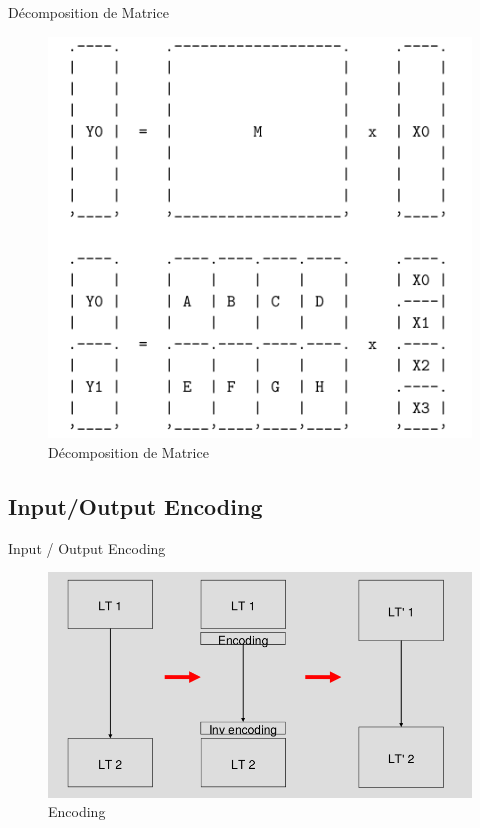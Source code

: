 \documentclass{beamer}
\begin{document}
\begin{frame}{Décomposition de Matrice}
  \begin{figure}[h]
    \centering
    \includegraphics[scale=0.50]{images/decompo_matrice.png}
    \caption{Décomposition de Matrice}
    \label{fig:keygen}
  \end{figure}
\end{frame}

\subsection{Input/Output Encoding}

\begin{frame}{Input / Output Encoding}
  \begin{figure}[h]
    \centering
    \includegraphics[scale=0.5]{images/encoding.png}
    \caption{Encoding}
    \label{fig:keygen}
  \end{figure}
\end{frame}
\end{document}
